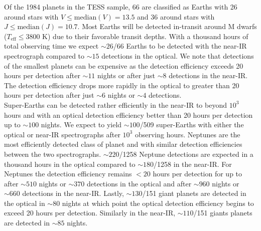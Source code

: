 Of the 1984 planets in the 
TESS sample, 66 are classified as Earths with 26 around stars with
$V \leq \text{median}(V) = 13.5$ and 36 around stars with $J \leq \text{median}(J)=10.7$. Most Earths will
be detected in-transit around M dwarfs ($T_{\text{eff}} \leq 3800$ K) due to their favorable transit depths.
With a thousand hours of total observing time we expect $\sim 26$/66 Earths to be detected with the 
near-IR spectrograph compared to $\sim 15$ detections in the optical. We note that detections of the smallest
planets can be expensive as the detection efficiency exceeds 20 hours per detection
after $\sim 11$ nights or after just $\sim 8$ detections in the near-IR. The detection efficiency
drops more rapidly in the optical to greater than 20 hours per detection after just $\sim 6$ nights or
$\sim 4$ detections. \\

Super-Earths can be detected rather efficiently in the near-IR to beyond $10^3$ hours and with an optical
detection efficiency better than 20 hours per detection up to $\sim 100$ nights.
We expect to yield $\sim 100$/509 super-Earths with either the optical or near-IR
spectrographs after $10^3$ observing hours.
Neptunes are the most efficiently detected class of planet and with similar detection efficiencies between the two
spectrographs. $\sim 220$/1258 Neptune detections are expected in a thousand hours in the optical
compared to $\sim 180$/1258 in the near-IR. For Neptunes
the detection efficiency remains $<20$ hours per detection for up to 
after $\sim 510$ nights or $\sim 370$ detections in the optical and after $\sim 960$ nights or $\sim 660$ detections
in the near-IR. Lastly, $\sim 130$/151 giant planets are detected in the optical in $\sim 80$ nights at which point the
optical detection efficiency begins to exceed 20 hours per detection. Similarly in the near-IR, $\sim 110$/151 giants planets
are detected in $\sim 85$ nights. 

